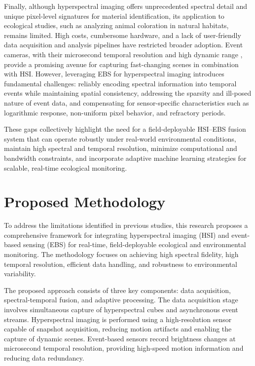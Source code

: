 \documentclass[conference]{IEEEtran}
\begin{document}
Finally, although hyperspectral imaging offers unprecedented spectral detail and unique pixel-level signatures for material identification, its application to ecological studies, such as analyzing animal coloration in natural habitats, remains limited. High costs, cumbersome hardware, and a lack of user-friendly data acquisition and analysis pipelines have restricted broader adoption. Event cameras, with their microsecond temporal resolution and high dynamic range \cite{liu2022event, delbruck2019neuromorphic}, provide a promising avenue for capturing fast-changing scenes in combination with HSI. However, leveraging EBS for hyperspectral imaging introduces fundamental challenges: reliably encoding spectral information into temporal events while maintaining spatial consistency, addressing the sparsity and ill-posed nature of event data, and compensating for sensor-specific characteristics such as logarithmic response, non-uniform pixel behavior, and refractory periods.

These gaps collectively highlight the need for a field-deployable HSI–EBS fusion system that can operate robustly under real-world environmental conditions, maintain high spectral and temporal resolution, minimize computational and bandwidth constraints, and incorporate adaptive machine learning strategies for scalable, real-time ecological monitoring.

\section{Proposed Methodology}

To address the limitations identified in previous studies, this research proposes a comprehensive framework for integrating hyperspectral imaging (HSI) and event-based sensing (EBS) for real-time, field-deployable ecological and environmental monitoring. The methodology focuses on achieving high spectral fidelity, high temporal resolution, efficient data handling, and robustness to environmental variability.

The proposed approach consists of three key components: data acquisition, spectral-temporal fusion, and adaptive processing. The data acquisition stage involves simultaneous capture of hyperspectral cubes and asynchronous event streams. Hyperspectral imaging is performed using a high-resolution sensor capable of snapshot acquisition, reducing motion artifacts and enabling the capture of dynamic scenes. Event-based sensors record brightness changes at microsecond temporal resolution, providing high-speed motion information and reducing data redundancy.
\end{document}
